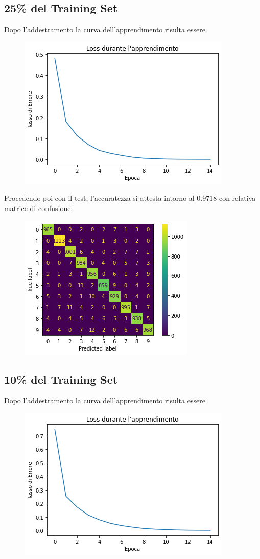 \documentclass[12pt, a4paper]{article}
\begin{document}
\subsection{25\% del Training Set}
Dopo l'addestramento la curva dell'apprendimento risulta essere
\begin{figure}[H]
    \centering
    \includegraphics[width=.5\textwidth]{Set25.png}
\end{figure}

Procedendo poi con il test, l'accuratezza si attesta intorno al \(0.9718\) con relativa matrice di confusione:
\begin{figure}[H]
    \centering
    \includegraphics[width=.5\textwidth]{Matrix25.png}
\end{figure}

\subsection{10\% del Training Set}
Dopo l'addestramento la curva dell'apprendimento risulta essere
\begin{figure}[H]
    \centering
    \includegraphics[width=.5\textwidth]{Set10.png}
\end{figure}
\end{document}
